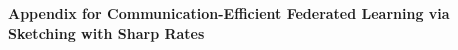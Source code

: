 \documentclass[sigconf, anonymous, review]{acmart}
\begin{document}


\newpage
\appendix
%

\onecolumn

{\centering
  {\Large\bfseries Appendix for Communication-Efficient Federated Learning via Sketching with Sharp Rates \par}}







\end{document}
